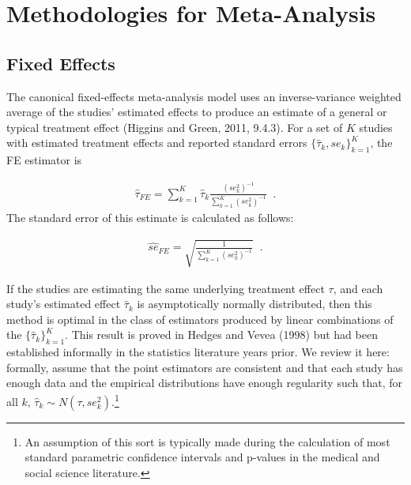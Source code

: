 \documentclass[12pt]{article}
\begin{document}
\section{Methodologies for Meta-Analysis}

\subsection{Fixed Effects}

The canonical fixed-effects meta-analysis model uses an inverse-variance weighted average of the studies' estimated effects to produce an estimate of a general or typical treatment effect (Higgins and Green, 2011, 9.4.3). For a set of $K$ studies with estimated treatment effects and reported standard errors  $\{\hat{\tau}_k, se_k\}_{k=1}^K$, the FE estimator is

\begin{equation}
\label{fe_tau}
\begin{aligned}
\hat{\tau}_{FE} = \sum_{k=1}^K \hat{\tau}_k \frac{  (se^2_k)^{-1}   }{  \sum_{k=1}^K  (se^2_k)^{-1}  } \; \; .
\end{aligned}
\end{equation}
The standard error of this estimate is calculated as follows:

\begin{equation}
\label{fe_se}
\begin{aligned}
\hat{se}_{FE} = \sqrt{ \frac{ 1  }{  \sum_{k=1}^K  (se^2_k)^{-1}  }} \; \; .
\end{aligned}
\end{equation}

If the studies are estimating the same underlying treatment effect $\tau$, and each study's estimated effect $\hat{\tau}_k$ is asymptotically  normally distributed, then this method is optimal in the class of estimators produced by linear combinations of the $\{\hat{\tau}_k\}_{k=1}^K$. This result is proved in Hedges and Vevea (1998) but had been established informally in the statistics literature years prior. We review it here: formally, assume that the point estimators are consistent and that each study has enough data and the empirical distributions have enough regularity such that, for all $k$, $\hat{\tau}_k \sim N(\tau, se^2_{k})$.\footnote{An assumption of this sort is typically made during the calculation of most standard parametric confidence intervals and p-values in the medical and social science literature.}
\end{document}
